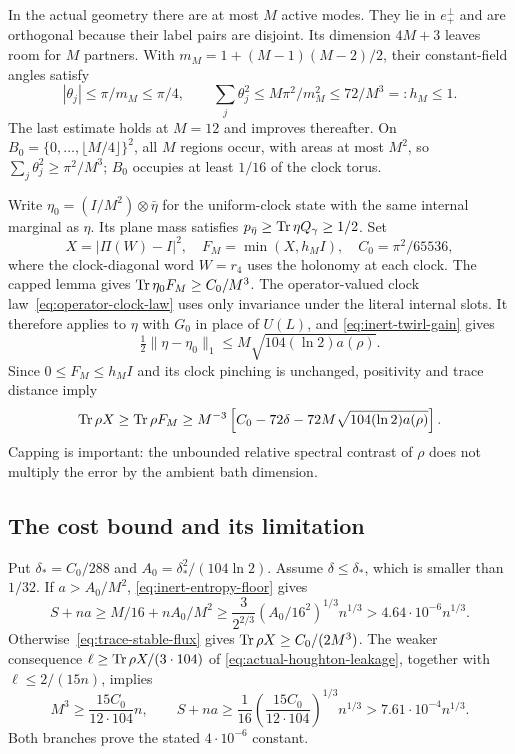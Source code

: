 In the actual geometry there are at most $M$ active modes. They lie
in $e_+^\perp$ and are orthogonal because their label pairs are
disjoint. Its dimension $4M+3$ leaves room for $M$ partners. With
$m_M=1+(M-1)(M-2)/2$, their constant-field angles satisfy
\[
 |\theta_j|\leq\pi/m_M\leq\pi/4,\qquad
 \sum_j\theta_j^2\leq M\pi^2/m_M^2\leq72/M^3=:h_M\leq1.
\]
The last estimate holds at $M=12$ and improves thereafter.
On $B_0=\{0,\ldots,\lfloor M/4\rfloor\}^2$, all $M$ regions
occur, with areas at most $M^2$, so
$\sum_j\theta_j^2\geq\pi^2/M^3$; $B_0$ occupies at least
$1/16$ of the clock torus.

Write $\eta_0=(I/M^2)\otimes\bar\eta$ for the uniform-clock state
with the same internal marginal as $\eta$. Its plane mass satisfies
$p_{\bar\eta}\geq\operatorname{Tr}\eta Q_\gamma\geq1/2$. Set
\[
 X=|\Pi(W)-I|^2,\quad F_M=\min(X,h_MI),\quad
 C_0=\pi^2/65536,
\]
where the clock-diagonal word $W=r_4$ uses the holonomy at each
clock. The capped lemma gives
$\operatorname{Tr}\eta_0F_M\geq C_0/M^3$.
The operator-valued clock law~\eqref{eq:operator-clock-law}
uses only invariance under the literal internal slots. It therefore
applies to $\eta$ with $G_0$ in place of $U(L)$, and
\eqref{eq:inert-twirl-gain} gives
\[
 \tfrac12\|\eta-\eta_0\|_1
           \leq M\sqrt{104(\ln2)a(\rho)}.
\]
Since $0\leq F_M\leq h_MI$ and its clock pinching is unchanged,
positivity and trace distance imply
\begin{equation}\label{eq:trace-stable-flux}
 \operatorname{Tr}\rho X\geq\operatorname{Tr}\rho F_M\geq
 M^{-3}\left[C_0-72\delta-
                 72M\sqrt{104(\ln2)a(\rho)}\right].
\end{equation}
Capping is important: the unbounded relative spectral contrast of
$\rho$ does not multiply the error by the ambient bath dimension.

\subsection{The cost bound and its limitation}

Put $\delta_*=C_0/288$ and
$A_0=\delta_*^2/(104\ln2)$. Assume $\delta\leq\delta_*$,
which is smaller than $1/32$. If $a>A_0/M^2$,
\eqref{eq:inert-entropy-floor} gives
\[
 S+na\geq M/16+nA_0/M^2
 \geq\frac3{2^{2/3}}(A_0/16^2)^{1/3}n^{1/3}
 >4.64\cdot10^{-6}n^{1/3}.
\]
Otherwise~\eqref{eq:trace-stable-flux} gives
$\operatorname{Tr}\rho X\geq C_0/(2M^3)$. The weaker consequence
$\ell\geq\operatorname{Tr}\rho X/(3\cdot104)$ of
\eqref{eq:actual-houghton-leakage}, together with
$\ell\leq2/(15n)$, implies
\[
 M^3\geq\frac{15C_0}{12\cdot104}n,\qquad
 S+na\geq\frac1{16}
       \left(\frac{15C_0}{12\cdot104}\right)^{1/3}n^{1/3}
 >7.61\cdot10^{-4}n^{1/3}.
\]
Both branches prove the stated $4\cdot10^{-6}$ constant.

